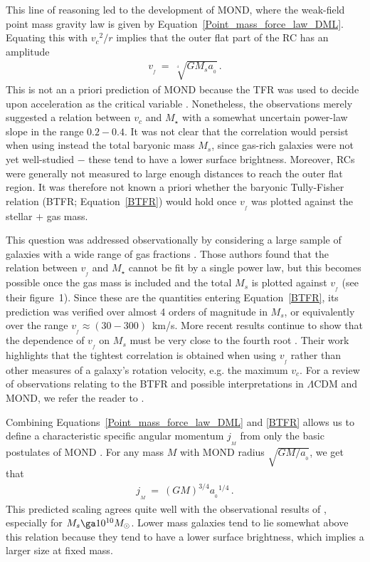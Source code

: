 \documentclass[fleqn,usenatbib,useAMS]{mnras} %
\begin{document}
This line of reasoning led to the development of MOND, where the weak-field point mass gravity law is given by Equation~\ref{Point_mass_force_law_DML}. Equating this with ${v_c}^2/r$ implies that the outer flat part of the RC has an amplitude
\begin{eqnarray}
	v_{_f} ~=~ \sqrt[^4]{GM_sa_{_0}} \, .
	\label{BTFR}
\end{eqnarray}
This is not an a priori prediction of MOND because the TFR was used to decide upon acceleration as the critical variable \citep{Sanders_2010, Sanders_2015}. Nonetheless, the observations merely suggested a relation between $v_c$ and $M_{\star}$ with a somewhat uncertain power-law slope in the range $0.2-0.4$. It was not clear that the correlation would persist when using instead the total baryonic mass $M_s$, since gas-rich galaxies were not yet well-studied $-$ these tend to have a lower surface brightness. Moreover, RCs were generally not measured to large enough distances to reach the outer flat region. It was therefore not known a priori whether the baryonic Tully-Fisher relation (BTFR; Equation~\ref{BTFR}) would hold once $v_{_f}$ was plotted against the stellar $+$ gas mass.

This question was addressed observationally by considering a large sample of galaxies with a wide range of gas fractions \citep{McGaugh_2000}. Those authors found that the relation between $v_{_f}$ and $M_{\star}$ cannot be fit by a single power law, but this becomes possible once the gas mass is included and the total $M_s$ is plotted against $v_{_f}$ (see their figure~1). Since these are the quantities entering Equation~\ref{BTFR}, its prediction was verified over almost 4 orders of magnitude in $M_s$, or equivalently over the range $v_{_f} \approx \left( 30 - 300 \right)$~km/s. More recent results continue to show that the dependence of $v_{_f}$ on $M_s$ must be very close to the fourth root \citep{Lelli_2019}. Their work highlights that the tightest correlation is obtained when using $v_{_f}$ rather than other measures of a galaxy's rotation velocity, e.g. the maximum $v_c$. For a review of observations relating to the BTFR and possible interpretations in $\Lambda$CDM and MOND, we refer the reader to \citet{McGaugh_2020}.

Combining Equations~\ref{Point_mass_force_law_DML} and \ref{BTFR} allows us to define a characteristic specific angular momentum $j_{_M}$ from only the basic postulates of MOND \citep{Milgrom_2021}. For any mass $M$ with MOND radius $\sqrt{GM/a_{_0}}$, we get that
\begin{eqnarray}
    j_{_M} ~=~ \left( GM \right)^{3/4} {a_{_0}}^{1/4} \, .
\end{eqnarray}
This predicted scaling agrees quite well with the observational results of \citet{Mancera_2021}, especially for $M_s \ga 10^{10} M_\odot$. Lower mass galaxies tend to lie somewhat above this relation because they tend to have a lower surface brightness, which implies a larger size at fixed mass.
\end{document}
